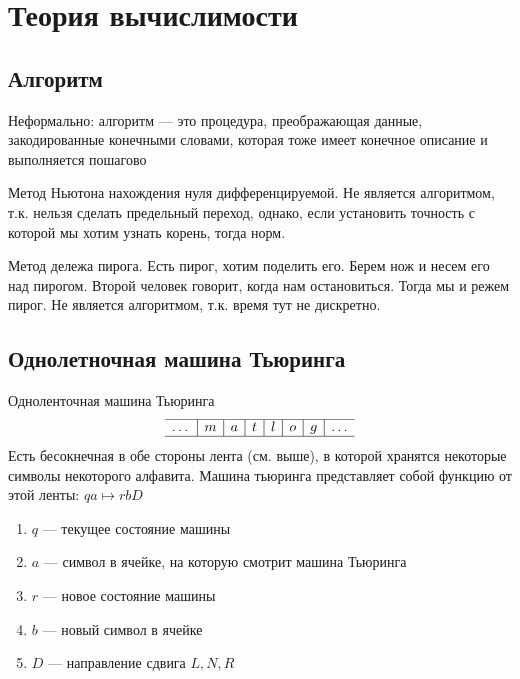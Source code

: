 
\section{Теория вычислимости}
\subsection{Алгоритм}
Неформально: алгоритм --- это процедура, преображающая данные, закодированные конечными словами, которая тоже имеет конечное описание и выполняется пошагово

\begin{example}[Не алгоритм]
    Метод Ньютона нахождения нуля дифференцируемой. Не является алгоритмом, т.к. нельзя сделать предельный переход, однако, если установить точность с которой мы хотим узнать корень, тогда норм.
\end{example}
\begin{example}[Не алгоритм]
    Метод дележа пирога. Есть пирог, хотим поделить его. Берем нож и несем его над пирогом. Второй человек говорит, когда нам остановиться. Тогда мы и режем пирог. Не является алгоритмом, т.к. время тут не дискретно.
\end{example}

\subsection{Однолетночная машина Тьюринга}
Одноленточная машина Тьюринга
\[\begin{array}{c|c|c|c|c|c|c|c}
    \hline
    \dots & m & a & t & l & o & g & \dots \\
    \hline
\end{array}\]
Есть бесокнечная в обе стороны лента (см. выше), в которой хранятся некоторые символы некоторого алфавита. Машина тьюринга представляет собой функцию от этой ленты:
\(qa \mapsto rbD\)
\begin{enumerate}
    \item \(q\) --- текущее состояние машины
    \item \(a\) --- символ в ячейке, на которую смотрит машина Тьюринга
    \item \(r\) --- новое состояние машины
    \item \(b\) --- новый символ в ячейке
    \item \(D\) --- направление сдвига \(L, N, R\)
\end{enumerate}

